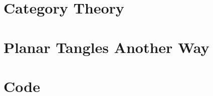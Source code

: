 \setcounter{secnumdepth}{0}

\chapter{Category Theory}
	
	
\chapter{Planar Tangles Another Way}\label{app:PA rigor}
	

%	

\chapter{Code}
	
	


